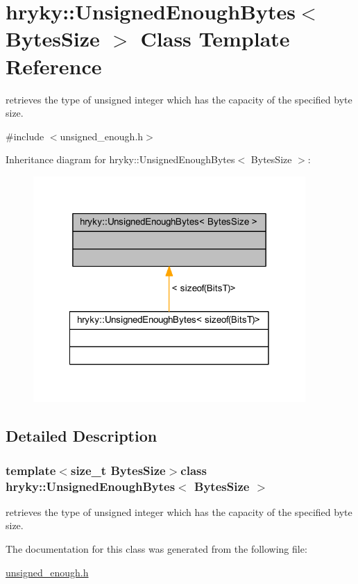 \hypertarget{classhryky_1_1_unsigned_enough_bytes}{\section{hryky\-:\-:Unsigned\-Enough\-Bytes$<$ Bytes\-Size $>$ Class Template Reference}
\label{classhryky_1_1_unsigned_enough_bytes}
}


retrieves the type of unsigned integer which has the capacity of the specified byte size.  




{\ttfamily \#include $<$unsigned\-\_\-enough.\-h$>$}



Inheritance diagram for hryky\-:\-:Unsigned\-Enough\-Bytes$<$ Bytes\-Size $>$\-:
\nopagebreak
\begin{figure}[H]
\begin{center}
\leavevmode
\includegraphics[width=294pt]{classhryky_1_1_unsigned_enough_bytes__inherit__graph}
\end{center}
\end{figure}


\subsection{Detailed Description}
\subsubsection*{template$<$size\-\_\-t Bytes\-Size$>$class hryky\-::\-Unsigned\-Enough\-Bytes$<$ Bytes\-Size $>$}

retrieves the type of unsigned integer which has the capacity of the specified byte size. 

The documentation for this class was generated from the following file\-:\begin{DoxyCompactItemize}
\item 
\hyperlink{unsigned__enough_8h}{unsigned\-\_\-enough.\-h}\end{DoxyCompactItemize}
